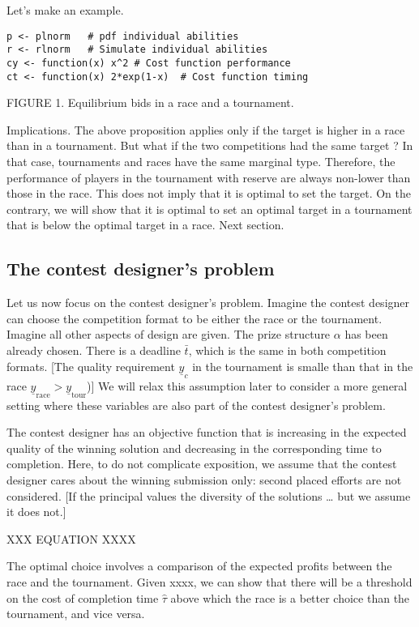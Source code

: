 \documentclass[11pt, titlepage]{article}
\newcommand\deadline{\bar{t}}
\newcommand\target{\underline{y}}
\newcommand\race{\text{race}}
\newcommand\tournament{\text{tour}}
\begin{document}
Let's make an example.

\begin{verbatim}
p <- plnorm   # pdf individual abilities 
r <- rlnorm   # Simulate individual abilities
cy <- function(x) x^2 # Cost function performance
ct <- function(x) 2*exp(1-x)  # Cost function timing 
\end{verbatim}

FIGURE 1. Equilibrium bids in a race and a tournament.

Implications. The above proposition applies only if the target is higher
in a race than in a tournament. But what if the two competitions had the
same target ? In that case, tournaments and races have the same marginal
type. Therefore, the performance of players in the tournament with
reserve are always non-lower than those in the race. This does not imply
that it is optimal to set the target. On the contrary, we will show that
it is optimal to set an optimal target in a tournament that is below the
optimal target in a race. Next section.

\subsection{The contest designer's
problem}\label{the-contest-designers-problem}

Let us now focus on the contest designer's problem. Imagine the contest
designer can choose the competition format to be either the race or the
tournament. Imagine all other aspects of design are given. The prize
structure \(\alpha\) has been already chosen. There is a deadline
\(\deadline\), which is the same in both competition formats. {[}The
quality requirement \(\target_c\) in the tournament is smalle than that
in the race \(\target_\race > \target_\tournament\)){]} We will relax
this assumption later to consider a more general setting where these
variables are also part of the contest designer's problem.

The contest designer has an objective function that is increasing in the
expected quality of the winning solution and decreasing in the
corresponding time to completion. Here, to do not complicate exposition,
we assume that the contest designer cares about the winning submission
only: second placed efforts are not considered. {[}If the principal
values the diversity of the solutions \ldots{} but we assume it does
not.{]}

XXX EQUATION XXXX

The optimal choice involves a comparison of the expected profits between
the race and the tournament. Given xxxx, we can show that there will be
a threshold on the cost of completion time \(\hat\tau\) above which the
race is a better choice than the tournament, and vice versa.
\end{document}

